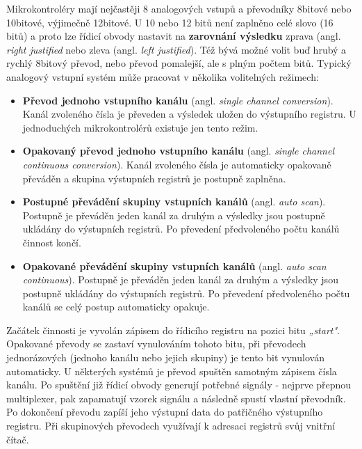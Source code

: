       Mikrokontroléry mají nejčastěji 8 analogových vstupů a převodníky 8bitové nebo 10bitové, 
      výjimečně 12bitové. U 10 nebo 12 bitů není zaplněno celé slovo (16 bitů) a proto lze řídicí 
      obvody nastavit na \textbf{zarovnání výsledku} zprava (angl. \emph{right justified} nebo 
      zleva (angl. \emph{left justified}). Též bývá možné volit buď hrubý a rychlý 8bitový převod, 
      nebo převod pomalejší, ale s plným počtem bitů. Typický analogový vstupní systém může 
      pracovat v několika volitelných režimech:
      \begin{itemize}[noitemsep]
        \item \textbf{Převod jednoho vstupního kanálu} (angl. \emph{single channel conversion}).  
              Kanál zvoleného čísla je převeden a výsledek uložen do výstupního registru. U 
              jednoduchých mikrokontrolérů existuje jen tento režim.
        \item \textbf{Opakovaný převod jednoho vstupního kanálu} (angl. \emph{single channel     
              continuous conversion}). Kanál zvoleného čísla je automaticky opakovaně převáděn a 
              skupina výstupních registrů je postupně zaplněna.
        \item \textbf{Postupné převádění skupiny vstupních kanálů} (angl. \emph{auto scan}).  
              Postupně je převáděn jeden kanál za druhým a výsledky jsou postupně ukládány do 
              výstupních registrů. Po převedení předvoleného počtu kanálů činnost končí.
        \item \textbf{Opakované převádění skupiny vstupních kanálů} (angl. \emph{auto scan          
              continuous}). Postupně je převáděn jeden kanál za druhým a výsledky jsou postupně 
              ukládány do výstupních registrů. Po převedení předvoleného počtu kanálů se celý 
              postup automaticky opakuje.        
      \end{itemize}
      
      Začátek činnosti je vyvolán zápisem do řídicího registru na pozici bitu \emph{„start"}. 
      Opakované převody se zastaví vynulováním tohoto bitu, při převodech jednorázových (jednoho 
      kanálu nebo jejich skupiny) je tento bit vynulován automaticky. U některých systémů je převod 
      spuštěn samotným zápisem čísla kanálu. Po spuštění již řídicí obvody generují potřebné 
      signály - nejprve přepnou multiplexer, pak zapamatují vzorek signálu a následně spustí 
      vlastní převodník. Po dokončení převodu zapíší jeho výstupní data do patřičného výstupního 
      registru. Při skupinových převodech využívají k adresaci registrů svůj vnitřní čítač.
      
